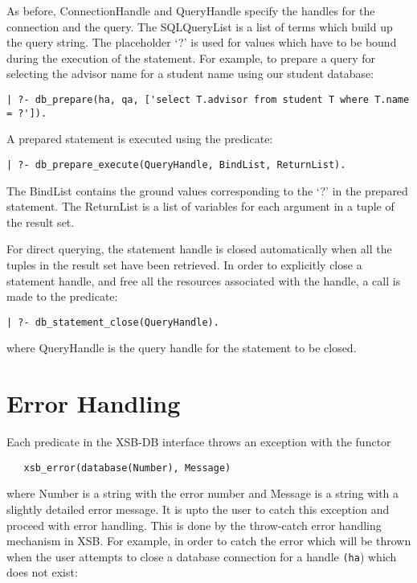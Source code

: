 As before, ConnectionHandle and QueryHandle specify the handles for
the connection and the query. The SQLQueryList is a list of terms which
build up the query string. The placeholder `?' is used for values which 
have to be bound during the execution of the statement.
For example, to prepare a query for selecting the advisor name for a student
name using our student database:

\begin{verbatim}
| ?- db_prepare(ha, qa, ['select T.advisor from student T where T.name = ?']).
\end{verbatim}

A prepared statement is executed using the predicate:

\begin{verbatim}
| ?- db_prepare_execute(QueryHandle, BindList, ReturnList).
\end{verbatim}

The BindList contains the ground values corresponding to the `?' in
the prepared statement. The ReturnList is a list of variables for
each argument in a tuple of the result set.

For direct querying, the statement handle is closed automatically when
all the tuples in the result set have been retrieved. In order to explicitly
close a statement handle, and free all the resources associated with
the handle, a call is made to the predicate:

\begin{verbatim}
| ?- db_statement_close(QueryHandle).
\end{verbatim}

\noindent
where QueryHandle is the query handle for the statement to be closed.

\section{Error Handling}

Each predicate in the XSB-DB interface throws an exception with the functor 
\begin{verbatim}
   xsb_error(database(Number), Message) 
\end{verbatim}
where Number is a string with the 
error number and Message is a string with a slightly detailed error message.
It is upto the user to catch this exception
and proceed with error handling. This is done by the throw-catch error
handling mechanism in XSB. For example, in order to catch the error which
will be thrown when the user attempts to close a database connection for 
a handle {\tt (ha}) which does not exist:

